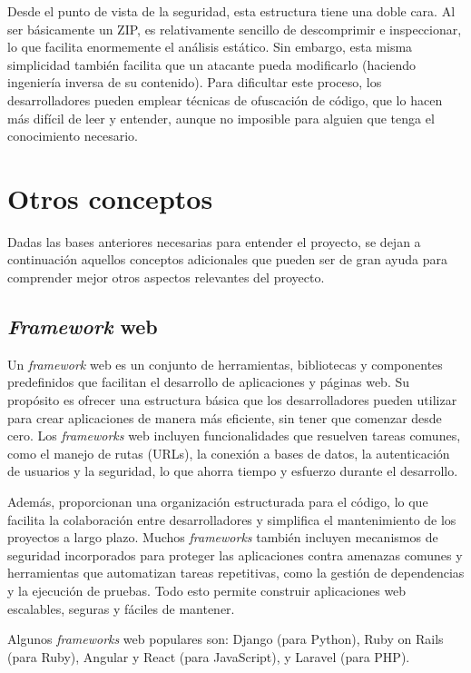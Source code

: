 Desde el punto de vista de la seguridad, esta estructura tiene una doble cara. Al ser básicamente un ZIP, es relativamente sencillo de descomprimir e inspeccionar, lo que facilita enormemente el análisis estático. Sin embargo, esta misma simplicidad también facilita que un atacante pueda modificarlo (haciendo ingeniería inversa de su contenido). Para dificultar este proceso, los desarrolladores pueden emplear técnicas de ofuscación de código, que lo hacen más difícil de leer y entender, aunque no imposible para alguien que tenga el conocimiento necesario.

\section{Otros conceptos}

Dadas las bases anteriores necesarias para entender el proyecto, se dejan a continuación aquellos conceptos adicionales que pueden ser de gran ayuda para comprender mejor otros aspectos relevantes del proyecto.

\subsection{\textit{Framework} web}

Un \textit{framework} web es un conjunto de herramientas, bibliotecas y componentes predefinidos que facilitan el desarrollo de aplicaciones y páginas web. Su propósito es ofrecer una estructura básica que los desarrolladores pueden utilizar para crear aplicaciones de manera más eficiente, sin tener que comenzar desde cero. Los \textit{frameworks} web incluyen funcionalidades que resuelven tareas comunes, como el manejo de rutas (URLs), la conexión a bases de datos, la autenticación de usuarios y la seguridad, lo que ahorra tiempo y esfuerzo durante el desarrollo.

Además, proporcionan una organización estructurada para el código, lo que facilita la colaboración entre desarrolladores y simplifica el mantenimiento de los proyectos a largo plazo. Muchos \textit{frameworks} también incluyen mecanismos de seguridad incorporados para proteger las aplicaciones contra amenazas comunes y herramientas que automatizan tareas repetitivas, como la gestión de dependencias y la ejecución de pruebas. Todo esto permite construir aplicaciones web escalables, seguras y fáciles de mantener.

Algunos \textit{frameworks} web populares son: Django (para Python), Ruby on Rails (para Ruby), Angular y React (para JavaScript), y Laravel (para PHP).

